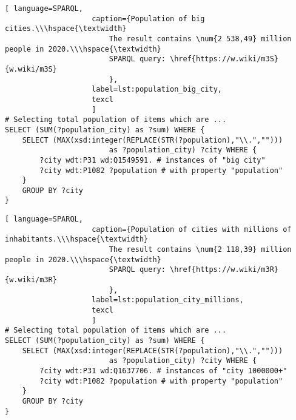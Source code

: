 
\begin{lstlisting}[ language=SPARQL, 
                    caption={Population of big cities.\\\hspace{\textwidth}
                        The result contains \num{2 538,49} million people in 2020.\\\hspace{\textwidth}
                        SPARQL query: \href{https://w.wiki/m3S}{w.wiki/m3S}
                        },
                    label=lst:population_big_city,
                    texcl 
                    ]
# Selecting total population of items which are ...
SELECT (SUM(?population_city) as ?sum) WHERE {                    
	SELECT (MAX(xsd:integer(REPLACE(STR(?population),"\\.",""))) 
						as ?population_city) ?city WHERE {
		?city wdt:P31 wd:Q1549591. # instances of "big city"
		?city wdt:P1082 ?population # with property "population"
	}
	GROUP BY ?city
}
\end{lstlisting}%

\begin{lstlisting}[ language=SPARQL, 
                    caption={Population of cities with millions of inhabitants.\\\hspace{\textwidth}
                        The result contains \num{2 118,39} million people in 2020.\\\hspace{\textwidth}
                        SPARQL query: \href{https://w.wiki/m3R}{w.wiki/m3R}
                        },
                    label=lst:population_city_millions,
                    texcl 
                    ]
# Selecting total population of items which are ...
SELECT (SUM(?population_city) as ?sum) WHERE {
	SELECT (MAX(xsd:integer(REPLACE(STR(?population),"\\.",""))) 
						as ?population_city) ?city WHERE {
		?city wdt:P31 wd:Q1637706. # instances of "city 1000000+"
		?city wdt:P1082 ?population # with property "population"
	}
	GROUP BY ?city
}
\end{lstlisting}%

